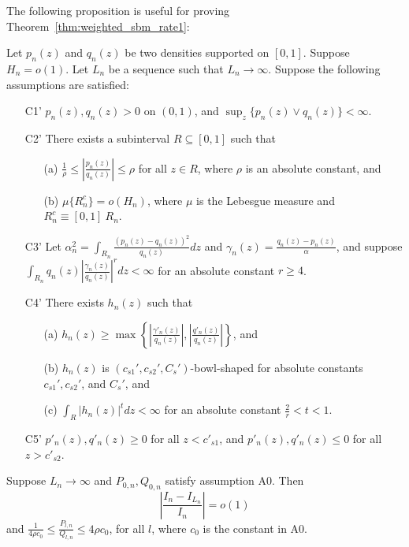 \documentclass{article}
\begin{document}
\medskip

\noindent The following proposition is useful for proving Theorem~\ref{thm:weighted_sbm_rate1}:
\begin{proposition} 
\label{prop:discretization1}
Let $p_n(z)$ and $q_n(z)$ be two densities supported on $[0,1]$. Suppose $H_n = o(1)$. Let $L_n$ be a sequence such that $L_n \rightarrow \infty$. Suppose the following assumptions are satisfied:
\begin{enumerate}
\item[C1'] $p_n(z), q_n(z) > 0$ on $(0, 1)$, and $\sup_z \{p_n(z) \vee q_n(z)\} < \infty$. 
\item[C2'] There exists a subinterval $R \subseteq [0,1]$ such that
\begin{itemize}
\item[(a)] $\frac{1}{\rho} \leq \left| \frac{p_n(z)}{q_n(z)} \right| \leq \rho$ for all $z \in R$, where $\rho$ is an absolute constant, and
\item[(b)] $\mu\{R_n^c\} = o(H_n)$, where $\mu$ is the Lebesgue measure and $R_n^c \equiv [0,1] \ R_n$.
\end{itemize}
\item[C3'] Let $\alpha_n^2 = \int_{R_n} \frac{(p_n(z) - q_n(z))^2}{q_n(z)} dz$ and $\gamma_n(z) = \frac{q_n(z) - p_n(z)}{\alpha}$, and suppose $\int_{R_n} q_n(z) \left| \frac{\gamma_n(z)}{q_n(z)} \right|^r dz  < \infty$ for an absolute constant $r \geq 4$.
\item[C4'] There exists $h_n(z)$ such that
\begin{itemize}
\item[(a)] $h_n(z) \geq \max \left\{  \left|\frac{\gamma'_n(z)}{q_n(z)} \right|, \left|\frac{q'_n(z)}{q_n(z)}\right|  \right\}$, and
\item[(b)] $h_n(z)$ is $(c_{s1}', c_{s2}', C_s')$-bowl-shaped for absolute constants $c_{s1}', c_{s2}'$, and $C_s'$, and
\item[(c)] $\int_R |h_n(z)|^t dz < \infty$ for an absolute constant $\frac{2}{r} < t < 1$.
\end{itemize}
\item[C5'] $p'_n(z), q'_n(z) \geq 0$ for all $z < c'_{s1}$, and $p'_n(z), q'_n(z) \leq 0$ for all $z > c'_{s2}$.
\end{enumerate}
Suppose $L_n \rightarrow \infty$ and $P_{0,n}, Q_{0,n}$ satisfy assumption A0.
Then
 $$\left| \frac{I_n - I_{L_n}}{I_n} \right| = o(1)$$ 
and $\frac{1}{4\rho c_0} \leq \frac{P_{l,n}}{Q_{l,n}} \leq 4\rho c_0$, for all $l$, where $c_0$ is the constant in A0.
\end{proposition}
\end{document}
